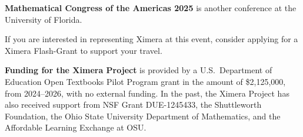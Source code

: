 \documentclass{techbrief}
\begin{document}
\begin{xframe}
    {\bfseries Mathematical Congress of the Americas 2025} is another
    conference at the University of Florida.

    If you are interested in representing Ximera at this event, consider
    applying for a Ximera Flash-Grant to support your travel.
\end{xframe}
\vfil

\begin{xframe}
    \textbf{Funding for the Ximera Project} is provided by
    a U.S.\ Department of Education Open Textbooks Pilot Program grant in the
    amount of \$2,125,000, from 2024--2026, with no external funding. In the
    past, the Ximera Project has
    also received support from NSF Grant DUE-1245433, the Shuttleworth
    Foundation, the Ohio State University
    Department of Mathematics, and the Affordable Learning Exchange at OSU.
\end{xframe}
\end{document}
